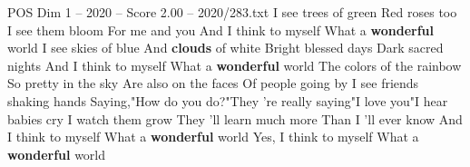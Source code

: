 \begin{textsample}{POS Dim 1 – 2020 – Score 2.00 – 2020/283.txt}  \label{ex:f1_pos_003}
I see trees of green Red roses too I see them bloom For me and you And I think to myself What a \textbf{wonderful} world I see skies of blue And \textbf{clouds} of white Bright blessed days Dark sacred nights And I think to myself What a \textbf{wonderful} world The colors of the rainbow So pretty in the sky Are also on the faces Of people going by I see friends shaking hands Saying,"How do you do?"They 're really saying"I love you"I hear babies cry I watch them grow They 'll learn much more Than I 'll ever know And I think to myself What a \textbf{wonderful} world Yes, I think to myself What a \textbf{wonderful} world

\end{textsample}
